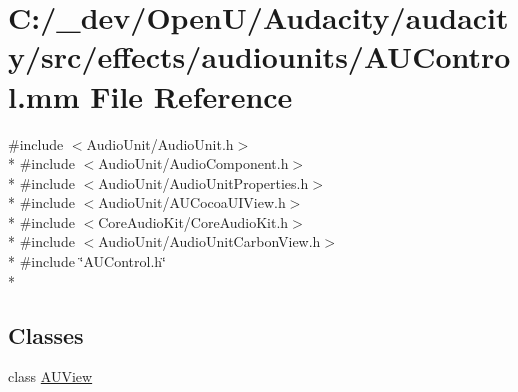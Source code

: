 \hypertarget{_a_u_control_8mm}{}\section{C\+:/\+\_\+dev/\+Open\+U/\+Audacity/audacity/src/effects/audiounits/\+A\+U\+Control.mm File Reference}
\label{_a_u_control_8mm}
{\ttfamily \#include $<$Audio\+Unit/\+Audio\+Unit.\+h$>$}\\*
{\ttfamily \#include $<$Audio\+Unit/\+Audio\+Component.\+h$>$}\\*
{\ttfamily \#include $<$Audio\+Unit/\+Audio\+Unit\+Properties.\+h$>$}\\*
{\ttfamily \#include $<$Audio\+Unit/\+A\+U\+Cocoa\+U\+I\+View.\+h$>$}\\*
{\ttfamily \#include $<$Core\+Audio\+Kit/\+Core\+Audio\+Kit.\+h$>$}\\*
{\ttfamily \#include $<$Audio\+Unit/\+Audio\+Unit\+Carbon\+View.\+h$>$}\\*
{\ttfamily \#include \char`\"{}A\+U\+Control.\+h\char`\"{}}\\*
\subsection*{Classes}
\begin{DoxyCompactItemize}
\item 
class \hyperlink{interface_a_u_view}{A\+U\+View}
\end{DoxyCompactItemize}
